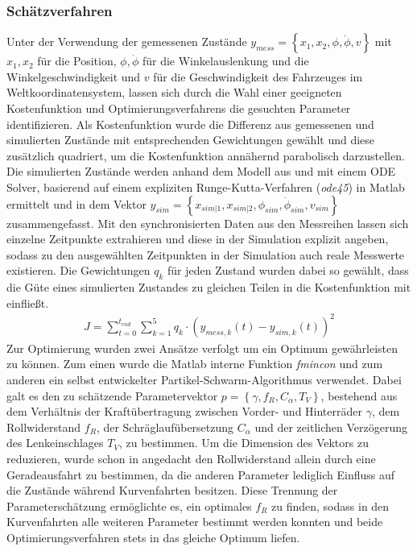 \subsubsection{Schätzverfahren}
Unter der Verwendung der gemessenen Zustände $y_{mess} = \left \{x_1, x_2, \phi, \dot{\phi}, v  \right \}$ mit $x_1, x_2$ für die Position, $\phi, \dot{\phi}$ für die Winkelauslenkung und die Winkelgeschwindigkeit und $v$ für die Geschwindigkeit des Fahrzeuges im Weltkoordinatensystem, lassen sich durch die Wahl einer geeigneten Kostenfunktion und Optimierungsverfahrens die gesuchten Parameter identifizieren. Als Kostenfunktion wurde die Differenz aus gemessenen und simulierten Zustände mit entsprechenden Gewichtungen gewählt und diese zusätzlich quadriert, um die Kostenfunktion annähernd parabolisch darzustellen. Die simulierten Zustände werden anhand dem Modell aus \cite{VikAnd} und mit einem ODE Solver, basierend auf einem expliziten Runge-Kutta-Verfahren (\textit{ode45}) in Matlab ermittelt und in dem Vektor $y_{sim} = \left \{x_{sim|1}, x_{sim|2}, \phi_{sim}, \dot{\phi}_{sim}, v_{sim}  \right \}$ zusammengefasst. Mit den synchronisierten Daten aus den Messreihen lassen sich einzelne Zeitpunkte extrahieren und diese in der Simulation explizit angeben, sodass zu den ausgewählten Zeitpunkten in der Simulation auch reale Messwerte existieren. Die Gewichtungen $q_k$ für jeden Zustand wurden dabei so gewählt, dass die Güte eines simulierten Zustandes zu gleichen Teilen in die Kostenfunktion mit einfließt.
\begin{align*}
J = \sum_{t=0}^{t_{end}}\sum_{k = 1}^{5} q_k\cdot  \left (y_{mess, k}\left ( t \right ) - y_{sim, k}\left ( t \right )  \right )^2
\end{align*}
Zur Optimierung wurden zwei Ansätze verfolgt um ein Optimum gewährleisten zu können. Zum einen wurde die Matlab interne Funktion \textit{fmincon} und zum anderen ein selbst entwickelter Partikel-Schwarm-Algorithmus verwendet. Dabei galt es den zu schätzende Parametervektor $p=\left \{ \gamma, f_R, C_{\alpha}, T_V\right \}$, bestehend aus dem Verhältnis der Kraftübertragung zwischen Vorder- und Hinterräder $\gamma$, dem Rollwiderstand $f_R$, der Schräglaufübersetzung $C_{\alpha}$ und der zeitlichen Verzögerung des Lenkeinschlages $T_V$, zu bestimmen. Um die Dimension des Vektors zu reduzieren, wurde schon in \cite{VikAnd} angedacht den Rollwiderstand allein durch eine Geradeausfahrt zu bestimmen, da die anderen Parameter lediglich Einfluss auf die Zustände während Kurvenfahrten besitzen. Diese Trennung der Parameterschätzung ermöglichte es, ein optimales $f_R$ zu finden, sodass in den Kurvenfahrten alle weiteren Parameter bestimmt werden  konnten und beide Optimierungsverfahren stets in das gleiche Optimum liefen.

